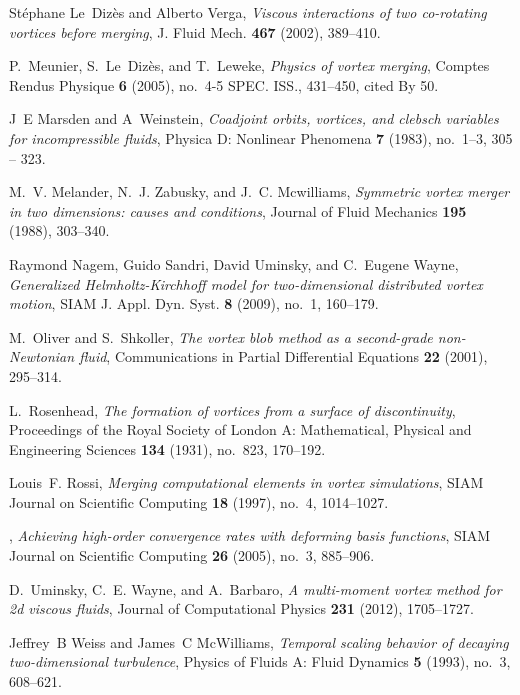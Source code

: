 \documentclass[12pt]{amsart}
\theoremstyle{remark}
\begin{document}
\begin{thebibliography}{FDMM91}
St{\'e}phane Le~Diz{\`e}s and Alberto Verga, \emph{Viscous interactions of two
  co-rotating vortices before merging}, J. Fluid Mech. \textbf{467} (2002),
  389--410. 

P.~Meunier, S.~Le~Diz{\`e}s, and T.~Leweke, \emph{Physics of vortex merging},
  Comptes Rendus Physique \textbf{6} (2005), no.~4-5 SPEC. ISS., 431--450,
  cited By 50.

J~E Marsden and A~Weinstein, \emph{Coadjoint orbits, vortices, and clebsch
  variables for incompressible fluids}, Physica D: Nonlinear Phenomena
  \textbf{7} (1983), no.~1--3, 305 -- 323.

M.~V. Melander, N.~J. Zabusky, and J.~C. Mcwilliams, \emph{Symmetric vortex
  merger in two dimensions: causes and conditions}, Journal of Fluid Mechanics
  \textbf{195} (1988), 303--340.

Raymond Nagem, Guido Sandri, David Uminsky, and C.~Eugene Wayne,
  \emph{Generalized {H}elmholtz-{K}irchhoff model for two-dimensional
  distributed vortex motion}, SIAM J. Appl. Dyn. Syst. \textbf{8} (2009),
  no.~1, 160--179. 

M.~Oliver and S.~Shkoller, \emph{{The vortex blob method as a second-grade
  non-Newtonian fluid}}, Communications in Partial Differential Equations
  \textbf{22} (2001), 295--314.

L.~Rosenhead, \emph{The formation of vortices from a surface of discontinuity},
  Proceedings of the Royal Society of London A: Mathematical, Physical and
  Engineering Sciences \textbf{134} (1931), no.~823, 170--192.

Louis~F. Rossi, \emph{Merging computational elements in vortex simulations},
  SIAM Journal on Scientific Computing \textbf{18} (1997), no.~4, 1014--1027.

\bysame, \emph{Achieving high-order convergence rates with deforming basis
  functions}, SIAM Journal on Scientific Computing \textbf{26} (2005), no.~3,
  885--906.

D.~Uminsky, C.~E. Wayne, and A.~Barbaro, \emph{A multi-moment vortex method for
  2d viscous fluids}, Journal of Computational Physics \textbf{231} (2012),
  1705--1727.

Jeffrey~B Weiss and James~C McWilliams, \emph{Temporal scaling behavior of
  decaying two-dimensional turbulence}, Physics of Fluids A: Fluid Dynamics
  \textbf{5} (1993), no.~3, 608--621.

\end{thebibliography}
\end{document}
